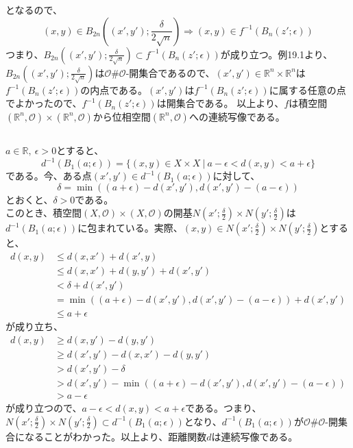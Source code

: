 \documentclass{jsarticle}
\begin{document}
となるので、
\[(x,y)\in B_{2n}((x',y');\frac{\delta}{2\sqrt{n}})\Longrightarrow (x,y)\in f^{-1}(B_n(z';\epsilon))\]
つまり、$B_{2n}((x',y');\frac{\delta}{2\sqrt{n}})\subset f^{-1}(B_n(z';\epsilon))$が成り立つ。例19.1より、$B_{2n}((x',y');\frac{\delta}{2\sqrt{n}})$は$\mathcal{O}\#\mathcal{O}$-開集合であるので、$(x',y')\in\mathbb{R}^n\times\mathbb{R}^n$は$ f^{-1}(B_n(z';\epsilon))$の内点である。$(x',y')$は$ f^{-1}(B_n(z';\epsilon))$に属する任意の点でよかったので、$ f^{-1}(B_n(z';\epsilon))$は開集合である。
以上より、$f$は積空間$(\mathbb{R}^n,\mathcal{O})\times(\mathbb{R}^n,\mathcal{O})$から位相空間$(\mathbb{R}^n,\mathcal{O})$への連続写像である。





\subsection{}
$a\in\mathbb{R},\ \epsilon>0$とすると、
\[d^{-1}(B_1(a; \epsilon))=\{(x,y)\in X\times X\ |\ a-\epsilon<d(x,y)<a+\epsilon\}\]
である。今、ある点$(x',y')\in d^{-1}(B_1(a; \epsilon))$に対して、
\[\delta=\min((a+\epsilon)-d(x',y'),d(x',y')-(a-\epsilon))\]
とおくと、$\delta>0$である。\\
このとき、積空間$(X,\mathcal{O})\times(X,\mathcal{O})$の開基$N(x';\frac{\delta}{2})\times N(y';\frac{\delta}{2})$は$d^{-1}(B_1(a; \epsilon))$に包まれている。実際、$(x,y)\in N(x';\frac{\delta}{2})\times N(y';\frac{\delta}{2})$とすると、
\begin{align*}
d(x,y)&\leq d(x,x')+d(x',y)\\
&\leq d(x,x')+ d(y,y') +d(x',y')\\
&< \delta + d(x',y')\\
&= \min((a+\epsilon)-d(x',y'),d(x',y')-(a-\epsilon))+d(x',y')\\
&\leq a+\epsilon
\end{align*}
が成り立ち、
\begin{align*}
d(x,y)&\geq d(x,y')-d(y,y')\\
&\geq d(x',y')-d(x,x')-d(y,y')\\
&> d(x',y')-\delta\\
&> d(x',y')-\min((a+\epsilon)-d(x',y'),d(x',y')-(a-\epsilon))\\
&> a-\epsilon
\end{align*}
が成り立つので、$a-\epsilon<d(x,y)<a+\epsilon$である。つまり、$N(x';\frac{\delta}{2})\times N(y';\frac{\delta}{2})\subset d^{-1}(B_1(a; \epsilon))$となり、$d^{-1}(B_1(a; \epsilon))$が$\mathcal{O}\#\mathcal{O}$-開集合になることがわかった。以上より、距離関数$d$は連続写像である。
\end{document}
